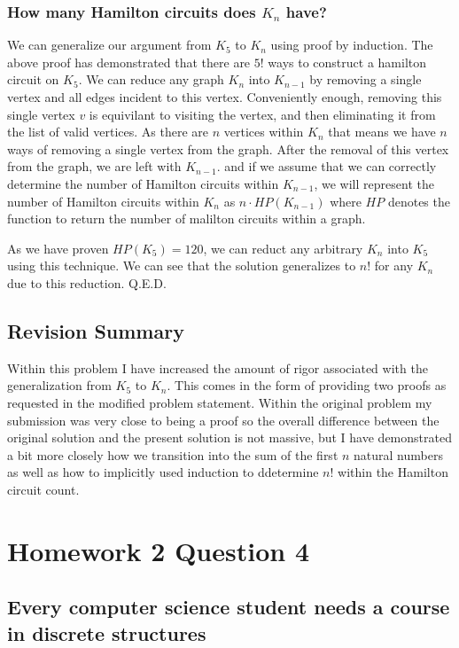 \documentclass{article}
\begin{document}
\subsubsection{How many Hamilton circuits does $K_n$ have?}
We can generalize our argument from $K_5$ to $K_n$ using proof by induction. The above proof has demonstrated that there are $5!$ ways to construct a hamilton circuit on $K_5$. We can reduce any graph $K_n$ into $K_{n-1}$ by removing a single vertex and all edges incident to this vertex. Conveniently enough, removing this single vertex $v$ is equivilant to visiting the vertex, and then eliminating it from the list of valid vertices. As there are $n$ vertices within $K_n$ that means we have $n$ ways of removing a single vertex from the graph. After the removal of this vertex from the graph, we are left with $K_{n-1}$. and if we assume that we can correctly determine the number of Hamilton circuits within $K_{n-1}$, we will represent the number of Hamilton circuits within $K_n$ as $n\cdot HP(K_{n-1})$ where $HP$ denotes the function to return the number of malilton circuits within a graph.

As we have proven $HP(K_5)=120$, we can reduct any arbitrary $K_n$ into $K_5$ using this technique. We can see that the solution generalizes to $n!$ for any $K_n$ due to this reduction. Q.E.D.

\subsection{Revision Summary}
Within this problem I have increased the amount of rigor associated with the generalization from $K_5$ to $K_n$. This comes in the form of providing two proofs as requested in the modified problem statement. Within the original problem my submission was very close to being a proof so the overall difference between the original solution and the present solution is not massive, but I have demonstrated a bit more closely how we transition into the sum of the first $n$ natural numbers as well as how to implicitly used induction to ddetermine $n!$ within the Hamilton circuit count.

\newpage


\section{Homework 2 Question 4}
\subsection{Every computer science student needs a course in discrete structures}
\end{document}
